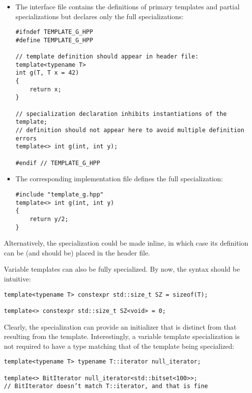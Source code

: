 \begin{itemize}
\item 
The interface file contains the definitions of primary templates and partial specializations but declares only the full specializations:

\begin{lstlisting}[style=styleCXX]
#ifndef TEMPLATE_G_HPP
#define TEMPLATE_G_HPP

// template definition should appear in header file:
template<typename T>
int g(T, T x = 42)
{
	return x;
}

// specialization declaration inhibits instantiations of the template;
// definition should not appear here to avoid multiple definition errors
template<> int g(int, int y);

#endif // TEMPLATE_G_HPP
\end{lstlisting}

\item 
The corresponding implementation file defines the full specialization:

\begin{lstlisting}[style=styleCXX]
#include "template_g.hpp"
template<> int g(int, int y)
{
	return y/2;
}
\end{lstlisting}
\end{itemize}

Alternatively, the specialization could be made inline, in which case its definition can be (and should be) placed in the header file.


Variable templates can also be fully specialized. By now, the syntax should be intuitive:

\begin{lstlisting}[style=styleCXX]
template<typename T> constexpr std::size_t SZ = sizeof(T);

template<> constexpr std::size_t SZ<void> = 0;
\end{lstlisting}

Clearly, the specialization can provide an initializer that is distinct from that resulting from the template. Interestingly, a variable template specialization is not required to have a type matching that of the template being specialized:

\begin{lstlisting}[style=styleCXX]
template<typename T> typename T::iterator null_iterator;

template<> BitIterator null_iterator<std::bitset<100>>;
// BitIterator doesn’t match T::iterator, and that is fine
\end{lstlisting}

